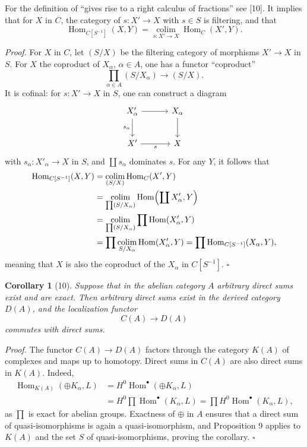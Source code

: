 \documentclass[11pt]{article}
\newcommand{\Hom}{\operatorname{Hom}}
\theoremstyle{deligne}
\newtheorem*{corollary*}{Corollary}
\newenvironment{proofdel}{\noindent\textit{Proof.}}{\hfill$\square$}
\begin{document}
For the definition of ``gives rise to a right calculus of fractions'' see [10]. It implies that for \(X\) in \(C\), the category of \(s:X'\to X\) with \(s\in S\) is filtering, and that
\[
\Hom_{C[S^{-1}]}(X,Y)=
\operatorname*{colim}_{s:X'\to X}\Hom_C(X',Y).
\]

\begin{proofdel}
For \(X\) in \(C\), let \((S/X)\) be the filtering category of morphisms \(X'\to X\) in \(S\). For \(X\) the coproduct of \(X_\alpha\), \(\alpha\in A\), one has a functor ``coproduct''
\[
\prod_{\alpha\in A}(S/X_\alpha)\longrightarrow(S/X).
\]
It is cofinal: for \(s:X'\to X\) in \(S\), one can construct a diagram
\[
\begin{tikzcd}[column sep=3.2em,row sep=2.2em]
X'_\alpha \arrow[r] \arrow[d,"s_\alpha"'] & X_\alpha \arrow[d]\\
X' \arrow[r,"s"'] & X
\end{tikzcd}
\]
with \(s_\alpha:X'_\alpha\to X\) in \(S\), and \(\coprod s_\alpha\) dominates \(s\). For any \(Y\), it follows that
\[
\begin{aligned}
\Hom_{C[S^{-1}]}(X,Y)
&=\operatorname*{colim}_{(S/X)}\Hom_C(X',Y)\\
&=\operatorname*{colim}_{\prod(S/X_\alpha)}\Hom\Bigl(\coprod X'_\alpha,Y\Bigr)\\
&=\operatorname*{colim}_{\prod(S/X_\alpha)}\prod\Hom(X'_\alpha,Y)\\
&=\prod\operatorname*{colim}_{S/X_\alpha}\Hom(X'_\alpha,Y)
 =\prod\Hom_{C[S^{-1}]}(X_\alpha,Y),
\end{aligned}
\]
meaning that \(X\) is also the coproduct of the \(X_\alpha\) in \(C[S^{-1}]\).
\end{proofdel}

\begin{corollary*}[10]
Suppose that in the abelian category \(A\) arbitrary direct sums exist and are exact. Then arbitrary direct sums exist in the derived category \(D(A)\), and the localization functor
\[
C(A)\longrightarrow D(A)
\]
commutes with direct sums.
\end{corollary*}

\begin{proofdel}
The functor \(C(A)\to D(A)\) factors through the category \(K(A)\) of complexes and maps up to homotopy. Direct sums in \(C(A)\) are also direct sums in \(K(A)\). Indeed,
\[
\begin{aligned}
\Hom_{K(A)}(\oplus K_\alpha,L)
&=H^0\Hom^\bullet(\oplus K_\alpha,L)\\
&=H^0\prod\Hom^\bullet(K_\alpha,L)
 =\prod H^0\Hom^\bullet(K_\alpha,L),
\end{aligned}
\]
as \(\prod\) is exact for abelian groups. Exactness of \(\oplus\) in \(A\) ensures that a direct sum of quasi-isomorphisms is again a quasi-isomorphism, and Proposition 9 applies to \(K(A)\) and the set \(S\) of quasi-isomorphisms, proving the corollary.
\end{proofdel}
\end{document}
